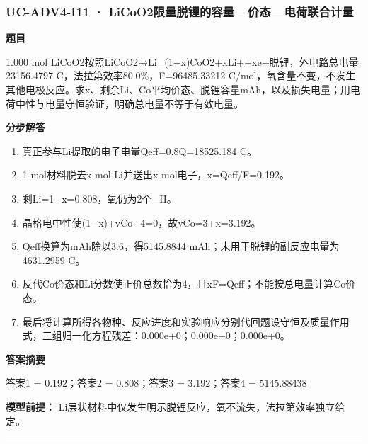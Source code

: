 \documentclass[UTF8,11pt,a4paper]{ctexart}
\begin{document}
\subsubsection*{UC-ADV4-I11 · LiCoO2限量脱锂的容量—价态—电荷联合计量}
\noindent\textbf{题目}\par
1.000 mol LiCoO2按照LiCoO2→Li\_(1−x)CoO2+xLi++xe−脱锂，外电路总电量23156.4797 C，法拉第效率80.0\%，F=96485.33212 C/mol，氧含量不变，不发生其他电极反应。求x、剩余Li、Co平均价态、脱锂容量mAh，以及损失电量；用电荷中性与电量守恒验证，明确总电量不等于有效电量。\par
\medskip\noindent\textbf{分步解答}
\begin{enumerate}
\item 真正参与Li提取的电子电量Qeff=0.8Q=18525.184 C。
\item 1 mol材料脱去x mol Li并送出x mol电子，x=Qeff/F=0.192。
\item 剩Li=1−x=0.808，氧仍为2个−II。
\item 晶格电中性使(1−x)+vCo−4=0，故vCo=3+x=3.192。
\item Qeff换算为mAh除以3.6，得5145.8844 mAh；未用于脱锂的副反应电量为4631.2959 C。
\item 反代Co价态和Li分数使正价总数恰为4，且xF=Qeff；不能按总电量计算Co价态。
\item 最后将计算所得各物种、反应进度和实验响应分别代回题设守恒及质量作用式，三组归一化方程残差：0.000e+0；0.000e+0；0.000e+0。
\end{enumerate}
\noindent\textbf{答案摘要}\par
答案1 = 0.192；答案2 = 0.808；答案3 = 3.192；答案4 = 5145.88438\par
\noindent\textbf{模型前提：}
Li层状材料中仅发生明示脱锂反应，氧不流失，法拉第效率独立给定。\par
\medskip\hrule\medskip
{}
\end{document}
